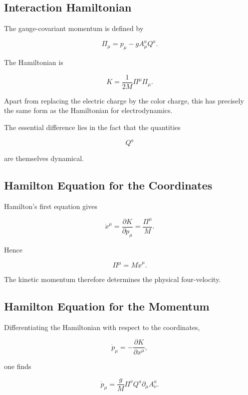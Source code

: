 
\subsection{Interaction Hamiltonian}

The gauge-covariant momentum is defined by

\[
\boxed{
\Pi_\mu
=
p_\mu
-
gA_\mu^aQ^a .
}
\]

The Hamiltonian is

\[
\boxed{
K
=
\frac{1}{2M}
\Pi^\mu\Pi_\mu .
}
\]

Apart from replacing the electric charge by the color charge, this has
precisely the same form as the Hamiltonian for electrodynamics.

The essential difference lies in the fact that the quantities

\[
Q^a
\]

are themselves dynamical.


\subsection{Hamilton Equation for the Coordinates}

Hamilton's first equation gives

\[
\boxed{
\dot x^\mu
=
\frac{\partial K}{\partial p_\mu}
=
\frac{\Pi^\mu}{M}.
}
\]

Hence

\[
\Pi^\mu
=
M\dot x^\mu .
\]

The kinetic momentum therefore determines the physical four-velocity.


\subsection{Hamilton Equation for the Momentum}

Differentiating the Hamiltonian with respect to the coordinates,

\[
\dot p_\mu
=
-
\frac{\partial K}{\partial x^\mu},
\]

one finds

\[
\dot p_\mu
=
\frac{g}{M}
\Pi^\nu
Q^a
\partial_\mu A_\nu^a.
\]

